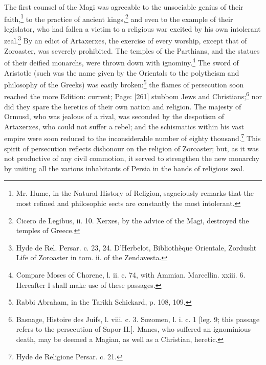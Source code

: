 The first counsel of the Magi was agreeable to the unsociable genius of their faith,\footnote{Mr. Hume, in the Natural History of Religion, sagaciously remarks that the most refined and philosophic sects are constantly the most intolerant.} to the practice of ancient kings,\footnote{Cicero de Legibus, ii. 10. Xerxes, by the advice of the Magi, destroyed the temples of Greece.} and even to the example of their legislator, who had fallen a victim to a religious war excited by his own intolerant zeal.\footnote{Hyde de Rel. Persar. c. 23, 24. D\texthebrew{}’Herbelot, Bibliothèque Orientale, Zordusht Life of Zoroaster in tom. ii. of the Zendavesta.} By an edict of Artaxerxes, the exercise of every worship, except that of Zoroaster, was severely prohibited. The temples of the Parthians, and the statues of their deified monarchs, were thrown down with ignominy.\footnote{Compare Moses of Chorene, l. ii. c. 74, with Ammian. Marcellin. xxiii. 6. Hereafter I shall make use of these passages.} The sword of Aristotle (such was the name given by the Orientals to the polytheism and philosophy of the Greeks) was easily broken:\footnote{Rabbi Abraham, in the Tarikh Schickard, p. 108, 109.} the flames of persecution soon reached the more Edition: current; Page: [261] stubbom Jews and Christians;\footnote{Basnage, Histoire des Juifs, l. viii. c. 3. Sozomen, l. i. c. 1 [leg. 9; this passage refers to the persecution of Sapor II.]. Manes, who suffered an ignominious death, may be deemed a Magian, as well as a Christian, heretic.} nor did they spare the heretics of their own nation and religion. The majesty of Ormusd, who was jealous of a rival, was seconded by the despotism of Artaxerxes, who could not suffer a rebel; and the schismatics within his vast empire were soon reduced to the inconsiderable number of eighty thousand.\footnote{Hyde de Religione Persar. c. 21.} This spirit of persecution reflects dishonour on the religion of Zoroaster; but, as it was not productive of any civil commotion, it served to strengthen the new monarchy by uniting all the various inhabitants of Persia in the bands of religious zeal.

